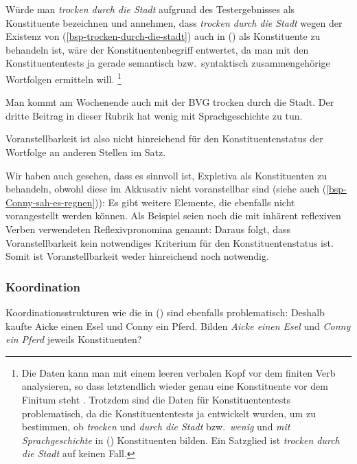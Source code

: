 Würde man \emph{trocken durch die Stadt} aufgrund des Testergebnisses als Konstituente bezeichnen
und annehmen, dass \emph{trocken durch die Stadt} wegen der Existenz von (\ref{bsp-trocken-durch-die-stadt})
auch in () als Konstituente zu behandeln ist, 
wäre der Konstituentenbegriff entwertet, da man mit den Konstituententests ja gerade semantisch
bzw.\ syntaktisch zusammengehörige Wortfolgen ermitteln will.%
\footnote{
  Die Daten kann man mit einem leeren verbalen Kopf vor dem finiten Verb analysieren,
  so dass letztendlich wieder genau eine Konstituente vor dem Finitum steht \citep{Mueller2005d,MuellerGS}.
  Trotzdem sind die Daten für Konstituententests problematisch, da die Konstituententests
  ja entwickelt wurden, um zu bestimmen, ob \zb \emph{trocken} und \emph{durch die Stadt}
  bzw.\ \emph{wenig} und \emph{mit Sprachgeschichte} in () Konstituenten bilden. Ein
  Satzglied ist \emph{trocken durch die Stadt} auf keinen Fall.%
}
\largerpage[1.5]

\eal
\ex Man kommt am Wochenende auch mit der BVG trocken durch die Stadt.
\ex Der dritte Beitrag in dieser Rubrik hat wenig mit Sprachgeschichte zu tun.
\zl

\noindent
Voranstellbarkeit ist also nicht hinreichend für den Konstituentenstatus der Wortfolge an anderen
Stellen im Satz.

Wir haben auch gesehen, dass es sinnvoll ist, Expletiva als Konstituenten zu behandeln,
obwohl diese im Akkusativ nicht voranstellbar sind (siehe auch (\ref{bsp-Conny-sah-es-regnen})):
\eal
{}
\zl
Es gibt weitere Elemente, die ebenfalls nicht vorangestellt werden können. Als Beispiel
seien noch die mit inhärent reflexiven Verben verwendeten Reflexivpronomina genannt:
\eal
{}
\zl
Daraus folgt, dass Voranstellbarkeit kein notwendiges Kriterium für den Konstituentenstatus
ist. Somit ist Voranstellbarkeit weder hinreichend noch notwendig.


\subsubsection{Koordination}

Koordinationsstrukturen wie die in () sind ebenfalls problematisch:
\ea
\label{ex-gapping}
Deshalb kaufte Aicke einen Esel und Conny ein Pferd.
\z
Bilden \emph{Aicke einen Esel} und \emph{Conny ein Pferd} jeweils Konstituenten?

